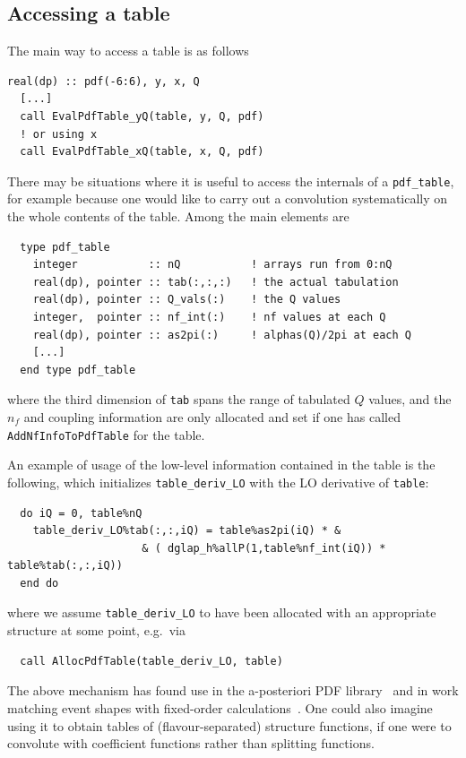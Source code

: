 \documentclass[12pt]{article}
\newcommand{\eg}{e.g.\ }
\newcommand{\ttt}[1]{\texttt{#1}}
\begin{document}
\subsection{Accessing a table}
\label{sec:acc_table}

The main way to access a table is as follows
\begin{lstlisting}
real(dp) :: pdf(-6:6), y, x, Q
  [...]
  call EvalPdfTable_yQ(table, y, Q, pdf)
  ! or using x
  call EvalPdfTable_xQ(table, x, Q, pdf)
\end{lstlisting}
There may be situations where it is useful to access the internals of
a \ttt{pdf\_table}, for example because one would like to carry out a
convolution systematically on the whole contents of the table. Among
the main elements are
\begin{lstlisting}
  type pdf_table
    integer           :: nQ           ! arrays run from 0:nQ
    real(dp), pointer :: tab(:,:,:)   ! the actual tabulation
    real(dp), pointer :: Q_vals(:)    ! the Q values 
    integer,  pointer :: nf_int(:)    ! nf values at each Q
    real(dp), pointer :: as2pi(:)     ! alphas(Q)/2pi at each Q
    [...]
  end type pdf_table
\end{lstlisting}
where the third dimension of \ttt{tab} spans the range of tabulated
$Q$ values, and the $n_f$ and coupling information are only allocated
and set if one has called \ttt{AddNfInfoToPdfTable} for the table.


An example of usage of the low-level information contained in the
table is the following, which initializes \ttt{table\_deriv\_LO} with
the LO derivative of \ttt{table}:
\begin{lstlisting}
  do iQ = 0, table%nQ
    table_deriv_LO%tab(:,:,iQ) = table%as2pi(iQ) * &
                     & ( dglap_h%allP(1,table%nf_int(iQ)) * table%tab(:,:,iQ))
  end do
\end{lstlisting}
where we assume \ttt{table\_deriv\_LO} to have been allocated with an
appropriate structure at some point, \eg via 
\begin{lstlisting}
  call AllocPdfTable(table_deriv_LO, table)
\end{lstlisting}
The above mechanism has found use in the a-posteriori PDF
library~\cite{APPL,Banfi:2007gu} 
and in work matching event shapes with fixed-order
calculations~\cite{caesar,DisResum}.
%
One could also imagine using it to obtain tables of
(flavour-separated) structure functions, if one were to convolute with
coefficient functions rather than splitting functions.
\end{document}
